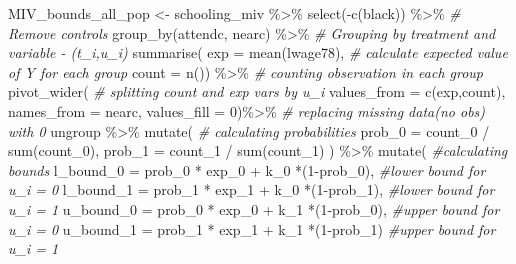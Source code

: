 \documentclass[
]{article}
\newenvironment{Shaded}{\begin{snugshade}}{\end{snugshade}}
\newcommand{\AttributeTok}[1]{\textcolor[rgb]{0.77,0.63,0.00}{#1}}
\newcommand{\CommentTok}[1]{\textcolor[rgb]{0.56,0.35,0.01}{\textit{#1}}}
\newcommand{\DecValTok}[1]{\textcolor[rgb]{0.00,0.00,0.81}{#1}}
\newcommand{\FunctionTok}[1]{\textcolor[rgb]{0.00,0.00,0.00}{#1}}
\newcommand{\NormalTok}[1]{#1}
\newcommand{\OtherTok}[1]{\textcolor[rgb]{0.56,0.35,0.01}{#1}}
\newcommand{\SpecialCharTok}[1]{\textcolor[rgb]{0.00,0.00,0.00}{#1}}
\begin{document}
\begin{Shaded}
\begin{Highlighting}[]
\NormalTok{MIV\_bounds\_all\_pop }\OtherTok{\textless{}{-}} 
\NormalTok{  schooling\_miv }\SpecialCharTok{\%\textgreater{}\%}
  \FunctionTok{select}\NormalTok{(}\SpecialCharTok{{-}}\FunctionTok{c}\NormalTok{(black)) }\SpecialCharTok{\%\textgreater{}\%}     \CommentTok{\# Remove controls}
  \FunctionTok{group\_by}\NormalTok{(attendc, nearc) }\SpecialCharTok{\%\textgreater{}\%}     \CommentTok{\# Grouping by treatment and variable {-} (t\_i,u\_i)}
  \FunctionTok{summarise}\NormalTok{(}
    \AttributeTok{exp =} \FunctionTok{mean}\NormalTok{(lwage78),           }\CommentTok{\# calculate expected value of Y for each group}
    \AttributeTok{count =} \FunctionTok{n}\NormalTok{()) }\SpecialCharTok{\%\textgreater{}\%}               \CommentTok{\# counting observation in each group}
  \FunctionTok{pivot\_wider}\NormalTok{(                     }\CommentTok{\# splitting count and exp vars by u\_i }
    \AttributeTok{values\_from =} \FunctionTok{c}\NormalTok{(exp,count),}
    \AttributeTok{names\_from =}\NormalTok{ nearc,}
    \AttributeTok{values\_fill =} \DecValTok{0}\NormalTok{)}\SpecialCharTok{\%\textgreater{}\%}            \CommentTok{\# replacing missing data(no obs) with 0}
\NormalTok{    ungroup }\SpecialCharTok{\%\textgreater{}\%} 
  \FunctionTok{mutate}\NormalTok{(                          }\CommentTok{\# calculating probabilities}
    \AttributeTok{prob\_0 =}\NormalTok{ count\_0 }\SpecialCharTok{/} \FunctionTok{sum}\NormalTok{(count\_0),}
    \AttributeTok{prob\_1 =}\NormalTok{ count\_1 }\SpecialCharTok{/} \FunctionTok{sum}\NormalTok{(count\_1)}
\NormalTok{    ) }\SpecialCharTok{\%\textgreater{}\%}
    \FunctionTok{mutate}\NormalTok{(                                         }\CommentTok{\#calculating bounds}
      \AttributeTok{l\_bound\_0 =}\NormalTok{ prob\_0 }\SpecialCharTok{*}\NormalTok{ exp\_0 }\SpecialCharTok{+}\NormalTok{ k\_0 }\SpecialCharTok{*}\NormalTok{(}\DecValTok{1}\SpecialCharTok{{-}}\NormalTok{prob\_0), }\CommentTok{\#lower bound for u\_i = 0 }
      \AttributeTok{l\_bound\_1 =}\NormalTok{ prob\_1 }\SpecialCharTok{*}\NormalTok{ exp\_1 }\SpecialCharTok{+}\NormalTok{ k\_0 }\SpecialCharTok{*}\NormalTok{(}\DecValTok{1}\SpecialCharTok{{-}}\NormalTok{prob\_1), }\CommentTok{\#lower bound for u\_i = 1}
      \AttributeTok{u\_bound\_0 =}\NormalTok{ prob\_0 }\SpecialCharTok{*}\NormalTok{ exp\_0 }\SpecialCharTok{+}\NormalTok{ k\_1 }\SpecialCharTok{*}\NormalTok{(}\DecValTok{1}\SpecialCharTok{{-}}\NormalTok{prob\_0), }\CommentTok{\#upper bound for u\_i = 0}
      \AttributeTok{u\_bound\_1 =}\NormalTok{ prob\_1 }\SpecialCharTok{*}\NormalTok{ exp\_1 }\SpecialCharTok{+}\NormalTok{ k\_1 }\SpecialCharTok{*}\NormalTok{(}\DecValTok{1}\SpecialCharTok{{-}}\NormalTok{prob\_1)  }\CommentTok{\#upper bound for u\_i = 1}

\end{Highlighting}
\end{Shaded}
\end{document}
